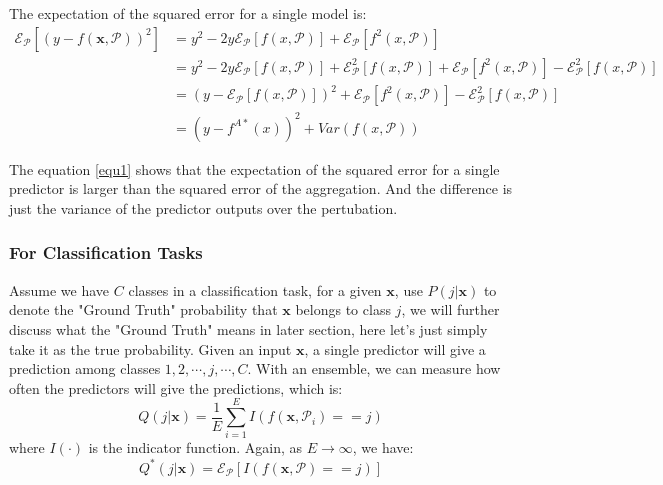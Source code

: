 \documentclass{article}
\begin{document}
The expectation of the squared error for a single model is:
\begin{equation}
\begin{align}
    \mathcal{E}_\mathcal{P}\left[{\left(y-f \left(\textbf{x} , \mathcal{P}\right)\right)}^2\right] &= y^2 - 2y\mathcal{E}_\mathcal{P}\left[f\left(x,\mathcal{P}\right)\right] + \mathcal{E}_\mathcal{P}\left[f^2\left(x,\mathcal{P}\right)\right] \\
    &= y^2 - 2y\mathcal{E}_\mathcal{P}\left[f\left(x,\mathcal{P}\right)\right] + \mathcal{E}^2_\mathcal{P}\left[f\left(x,\mathcal{P}\right)\right]+\mathcal{E}_\mathcal{P}\left[f^2\left(x,\mathcal{P}\right)\right]-\mathcal{E}^2_\mathcal{P}\left[f\left(x,\mathcal{P}\right)\right] \\
    &= {\left(y-\mathcal{E}_\mathcal{P}\left[f\left(x,\mathcal{P}\right)\right]\right)}^2+\mathcal{E}_\mathcal{P}\left[f^2\left(x,\mathcal{P}\right)\right]-\mathcal{E}^2_\mathcal{P}\left[f\left(x,\mathcal{P}\right)\right] \\
    &= {\left(y-f^{A*}\left(x\right)\right)}^2 + Var\left(f\left(x,\mathcal{P}\right)\right)
\end{align}
\label{equ1}
\end{equation}

The equation \ref{equ1} shows that the expectation of the squared error for a single predictor is larger than the squared error of the aggregation. And the difference is just the variance of the predictor outputs over the pertubation.

\subsubsection{For Classification Tasks}
Assume we have $C$ classes in a classification task, for a given $\textbf{x}$, use $P(j|\textbf{x})$ to denote the "Ground Truth" probability that $\textbf{x}$ belongs to class $j$, we will further discuss what the "Ground Truth" means in later section, here let's just simply take it as the true probability.
Given an input $\textbf{x}$, a single predictor will give a prediction among classes ${1,2,\cdots,j,\cdots,C}$. With an ensemble, we can measure how often the predictors will give the predictions, which is:
\begin{equation}
    Q(j|\textbf{x}) = \frac{1}{E}\sum_{i=1}^{E}I(f(\textbf{x},\mathcal{P}_i)==j)
\end{equation}
where $I(\cdot)$ is the indicator function. Again, as $E\rightarrow\infty$, we have:
\begin{equation}
    Q^*(j|\textbf{x}) = \mathcal{E}_\mathcal{P}[I(f(\textbf{x},\mathcal{P})==j)]
\end{equation}
\end{document}

